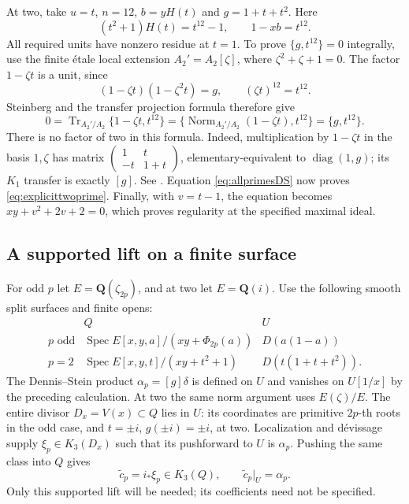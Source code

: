 \documentclass[11pt,a4paper]{article}
\theoremstyle{remark}
\newcommand{\Q}{\mathbf Q}
\newcommand{\Spec}{\operatorname{Spec}}
\begin{document}
At two, take $u=t$, $n=12$, $b=yH(t)$ and $g=1+t+t^2$.
Here
\[
 (t^2+1)H(t)=t^{12}-1,\qquad 1-xb=t^{12}.
\]
All required units have nonzero residue at $t=1$. To prove
$\{g,t^{12}\}=0$ integrally, use the finite \'etale local extension
$A_2'=A_2[\zeta]$, where $\zeta^2+\zeta+1=0$.
The factor $1-\zeta t$ is a unit, since
\[
 (1-\zeta t)(1-\zeta^2t)=g,
 \qquad (\zeta t)^{12}=t^{12}.
\]
Steinberg and the transfer projection formula therefore give
\[
 0=\operatorname{Tr}_{A_2'/A_2}
       \{1-\zeta t,t^{12}\}
   =\{\operatorname{Norm}_{A_2'/A_2}(1-\zeta t),t^{12}\}
   =\{g,t^{12}\}.
\]
There is no factor of two in this formula. Indeed, multiplication by
$1-\zeta t$ in the basis $1,\zeta$ has matrix
$\left(\begin{smallmatrix}1&t\\-t&1+t\end{smallmatrix}\right)$,
elementary-equivalent to $\operatorname{diag}(1,g)$; its $K_1$ transfer is exactly $[g]$.
See \cite[Chapter~III, Definition~5.11 and Exercise~5.6]{Weibel}.
Equation \eqref{eq:allprimesDS} now proves \eqref{eq:explicittwoprime}.
Finally, with $v=t-1$, the equation becomes
$xy+v^2+2v+2=0$, which proves regularity at the specified maximal ideal.

\subsection{A supported lift on a finite surface}

For odd $p$ let $E=\Q(\zeta_{2p})$, and at two let $E=\Q(i)$.
Use the following smooth split surfaces and finite opens:
\[
\begin{array}{c|c|c}
 & Q & U\\ \hline
p\text{ odd}
 & \Spec E[x,y,a]/(xy+\Phi_{2p}(a))
 & D(a(1-a))\\
p=2
 & \Spec E[x,y,t]/(xy+t^2+1)
 & D(t(1+t+t^2)).
\end{array}
\]
The Dennis--Stein product $\alpha_p=[g]\delta$ is defined on $U$
and vanishes on $U[1/x]$ by the preceding calculation.
At two the same norm argument uses $E(\zeta)/E$.
The entire divisor $D_x=V(x)\subset Q$ lies in $U$:
its coordinates are primitive $2p$-th roots in the odd case, and
$t=\pm i$, $g(\pm i)=\pm i$, at two.
Localization and d\'evissage supply $\xi_p\in K_3(D_x)$ such that its
pushforward to $U$ is $\alpha_p$. Pushing the same class into $Q$ gives
\begin{equation}\label{eq:allprimeslift}
 \widetilde c_p=i_*\xi_p\in K_3(Q),
 \qquad \widetilde c_p|_U=\alpha_p.
\end{equation}
Only this supported lift will be needed; its coefficients need not be specified.
\end{document}
